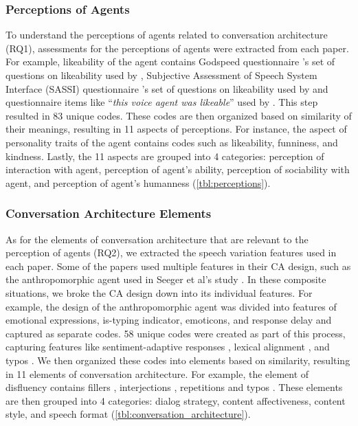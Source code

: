 \subsubsection*{Perceptions of Agents} To understand the perceptions of agents related to conversation architecture (RQ1), assessments for the perceptions of agents were extracted from each paper. 
For example, likeability of the agent contains Godspeed questionnaire \cite{bartneck2009measurement}'s set of questions on likeability used by \cite{linnemann2018can}\cmt{[15]}, Subjective Assessment of Speech System Interface (SASSI) questionnaire \cite{hone2000towards}'s set of questions on likeability used by \cite{chan2021kinvoices, choi2020nobody}\cmt{[74][54]} and questionnaire items like ``\textit{this voice agent was likeable}'' used by \cite{cuadra2021my}\cmt{[67]}. This step resulted in 83 unique codes. These codes are then organized based on similarity of their meanings, resulting in 11 aspects of perceptions. For instance, the aspect of personality traits of the agent contains codes such as likeability, funniness, and kindness. Lastly, the 11 aspects are grouped into 4 categories: perception of interaction with agent, perception of agent's ability, perception of sociability with agent, and perception of agent's humanness (\autoref{tbl:perceptions}).

\subsubsection*{Conversation Architecture Elements}
As for the elements of conversation architecture that are relevant to the perception of agents (RQ2), we extracted the speech variation features used in each paper. Some of the papers used multiple features in their CA design, such as the anthropomorphic agent used in Seeger et al's study \cite{seeger2021chatbots}\cmt{[35]}. In these composite situations, we broke the CA design down into its individual features. For example, the design of the anthropomorphic agent \cite{seeger2021chatbots}\cmt{[35]} was divided into features of emotional expressions, is-typing indicator, emoticons, and response delay and captured as separate codes. 58 unique codes were created as part of this process, capturing features like sentiment-adaptive responses \cite{diederich2019emulating}\cmt{[25]}, lexical alignment \cite{spillner2021talk}\cmt{[18]}, and typos \cite{westerman2019believe}\cmt{[9]}. We then organized these codes into elements based on similarity, resulting in 11 elements of conversation architecture. For example, the element of disfluency contains fillers \cite{jeong2019exploring, wester2015artificial}\cmt{[10][14]}, interjections \cite{ceha2022expressive, hu2021enhancing}\cmt{[77][56]}, repetitions \cite{yang2021effect}\cmt{[72]} and typos \cite{westerman2019believe}\cmt{[9]}. These elements are then grouped into 4 categories: dialog strategy, content affectiveness, content style, and speech format (\autoref{tbl:conversation_architecture}).

